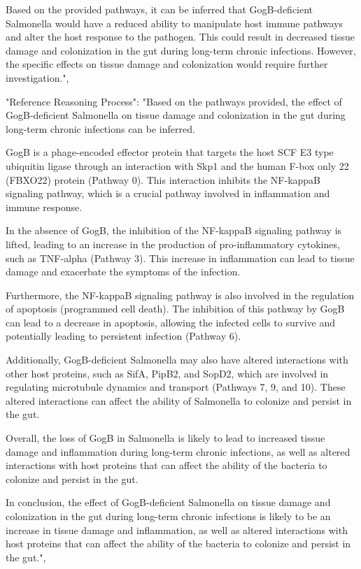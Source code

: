 \begin{tcolorbox}[breakable]
Based on the provided pathways, it can be inferred that GogB-deficient Salmonella would have a reduced ability to manipulate host immune pathways and alter the host response to the pathogen. This could result in decreased tissue damage and colonization in the gut during long-term chronic infections. However, the specific effects on tissue damage and colonization would require further investigation.",



"Reference Reasoning Process": "Based on the pathways provided, the effect of GogB-deficient Salmonella on tissue damage and colonization in the gut during long-term chronic infections can be inferred.

GogB is a phage-encoded effector protein that targets the host SCF E3 type ubiquitin ligase through an interaction with Skp1 and the human F-box only 22 (FBXO22) protein (Pathway 0). This interaction inhibits the NF-kappaB signaling pathway, which is a crucial pathway involved in inflammation and immune response.

In the absence of GogB, the inhibition of the NF-kappaB signaling pathway is lifted, leading to an increase in the production of pro-inflammatory cytokines, such as TNF-alpha (Pathway 3). This increase in inflammation can lead to tissue damage and exacerbate the symptoms of the infection.

Furthermore, the NF-kappaB signaling pathway is also involved in the regulation of apoptosis (programmed cell death). The inhibition of this pathway by GogB can lead to a decrease in apoptosis, allowing the infected cells to survive and potentially leading to persistent infection (Pathway 6).

Additionally, GogB-deficient Salmonella may also have altered interactions with other host proteins, such as SifA, PipB2, and SopD2, which are involved in regulating microtubule dynamics and transport (Pathways 7, 9, and 10). These altered interactions can affect the ability of Salmonella to colonize and persist in the gut.

Overall, the loss of GogB in Salmonella is likely to lead to increased tissue damage and inflammation during long-term chronic infections, as well as altered interactions with host proteins that can affect the ability of the bacteria to colonize and persist in the gut.

In conclusion, the effect of GogB-deficient Salmonella on tissue damage and colonization in the gut during long-term chronic infections is likely to be an increase in tissue damage and inflammation, as well as altered interactions with host proteins that can affect the ability of the bacteria to colonize and persist in the gut.",
\end{tcolorbox}
